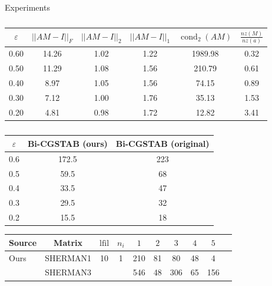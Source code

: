 \documentclass[paper=A4, fontsize=11pt]{scrartcl}
\theoremstyle{remark}
\begin{document}
\begin{section}{Experiments}
	
	\begin{table}[]
		\centering
	\begin{tabular}{@{}cccccc@{}}
\toprule
		$\varepsilon$ &    $||AM-I||_F$ &  $||AM-I||_2$ &   $||AM-I||_1$ &  $\operatorname{cond}_2(AM)$   & $\frac{{nz}(M)}{{nz}(a)}$ \\
		\midrule
		0.60 & 14.26 &  1.02  &  1.22 & 1989.98  &  0.32 \\

		0.50 & 11.29 &  1.08  &  1.56 & 210.79  &  0.61 \\

		0.40 &  8.97 &  1.05  &  1.56 & 74.15  &   0.89 \\

		0.30  & 7.12  & 1.00  &  1.76 & 35.13  &  1.53 \\

		0.20 &  4.81 &  0.98  &  1.72 &  12.82 &   3.41 \\
\bottomrule
	\end{tabular}
		\caption{}
	\label{tab:grote2}
\end{table}

	\begin{table}[]
		\centering
	\begin{tabular}{@{}ccc@{}}
		\toprule
		$\varepsilon$ & Bi-CGSTAB (ours) & Bi-CGSTAB (original)\\
		\midrule
		0.6    &   172.5       & 223\\     
		0.5    &   59.5        & 68\\    
		0.4    &   33.5        &47 \\    
		0.3    &   29.5        & 32 \\    
		0.2    &   15.5 & 18 \\
		\bottomrule
	\end{tabular}
	\caption{}
	\label{tab:grote1}
\end{table}

\begin{table}[]
	\centering
\begin{tabular}{@{}lc|cc|cccccc@{}}
	\toprule
	Source & Matrix &    $\text{lfil}$ &  $n_{i}$ &   $1$ &  $2$ &  $3$ & $4$ &  $5$ \\ \midrule
	\multirow{3}{*}{Ours} & SHERMAN1 & \multirow{3}{*}{10} & \multirow{3}{*}{1}  & 210 & 81 & 80 & 48 & 4  \\
	
	& SHERMAN3 &  &  & 546 & 48 & 306 & 65 & 156  \\


\end{tabular}
\end{table}
\end{section}
\end{document}
